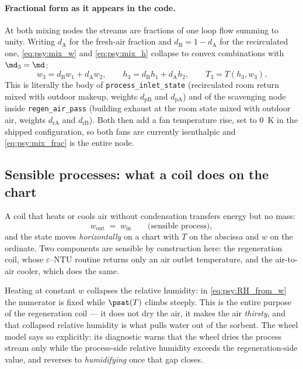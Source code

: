 \paragraph{Fractional form as it appears in the code.}
At both mixing nodes the streams are fractions of one loop flow summing to unity. Writing
$d_{\mathrm{A}}$ for the fresh-air fraction and $d_{\mathrm{B}} = 1 - d_{\mathrm{A}}$ for the
recirculated one, \eqref{eq:psy:mix_w} and \eqref{eq:psy:mix_h} collapse to convex combinations with
$\md_3 = \md$:
\begin{equation}
w_3 = d_{\mathrm{B}} w_1 + d_{\mathrm{A}} w_2 , \qquad
h_3 = d_{\mathrm{B}} h_1 + d_{\mathrm{A}} h_2 , \qquad T_3 = T(h_3, w_3) . \label{eq:psy:mix_frac}
\end{equation}
This is literally the body of \texttt{process\_inlet\_state} (recirculated room return mixed with
outdoor makeup, weights $d_{\mathrm{pB}}$ and $d_{\mathrm{pA}}$) and of the scavenging node inside
\texttt{regen\_air\_pass} (building exhaust at the room state mixed with outdoor air, weights
$d_{\mathrm{rA}}$ and $d_{\mathrm{rB}}$). Both then add a fan temperature rise, set to
\SI{0}{\kelvin} in the shipped configuration, so both fans are currently isenthalpic and
\eqref{eq:psy:mix_frac} is the entire node.

\subsection{Sensible processes: what a coil does on the chart}
\label{sec:psy:sensible}

A coil that heats or cools air without condensation transfers energy but no mass:
\begin{equation}
w_{\mathrm{out}} \;=\; w_{\mathrm{in}} \qquad \text{(sensible process)} , \label{eq:psy:sensible}
\end{equation}
and the state moves \emph{horizontally} on a chart with $T$ on the abscissa and $w$ on the ordinate.
Two components are sensible by construction here: the regeneration coil, whose $\varepsilon$--NTU
routine returns only an air outlet temperature, and the air-to-air cooler, which does the same.

Heating at constant $w$ collapses the relative humidity: in \eqref{eq:psy:RH_from_w} the numerator
is fixed while $\psat(T)$ climbs steeply. This is the entire purpose of the regeneration coil --- it
does not dry the air, it makes the air \emph{thirsty}, and that collapsed relative humidity is what
pulls water out of the sorbent. The wheel model says so explicitly: its diagnostic warns that the
wheel dries the process stream only while the process-side relative humidity exceeds the
regeneration-side value, and reverses to \emph{humidifying} once that gap closes.

